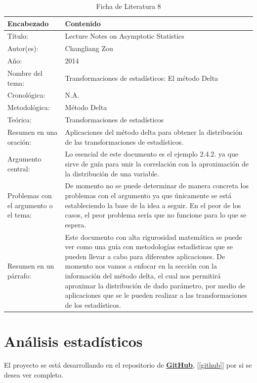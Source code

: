 \begin{table}[H]
    \caption{Ficha de Literatura 8}
    \begin{center}
        \begin{tabular}{  m{3cm} | m{12cm}  }
        \hline\textbf{ Encabezado} & \textbf{Contenido }\\ \hline
        Título: &  Lecture Notes on Asymptotic Statistics \\ \hline
        Autor(es): & Changliang Zou \\ \hline
        Año: &  2014\\ \hline
        Nombre del tema: &  Transformaciones de estadísticos: El método Delta\\ \hline
        Cronológica: &  N.A. \\ \hline
        Metodológica: & Método Delta \\  \hline
        Teórica: &  Transformaciones de estadísticos\\ \hline
        Resumen en una oración: &  Aplicaciones del método delta para obtener la distribución de las transformaciones de estadísticos. \\ \hline
        Argumento central: &  Lo esencial de este documento es el ejemplo 2.4.2. ya que sirve de guía para unir la correlación con la aproximación de la distribución de una variable. \\ \hline
        Problemas con el argumento o el tema: &  De momento no se puede determinar de manera concreta los problemas con el argumento ya que únicamente se está estableciendo la base de la idea a seguir. En el peor de los casos, el peor problema sería que no funcione para lo que se espera.\\ \hline
        Resumen en un párrafo: & Este documento con alta rigurosidad matemática se puede ver como una guía con metodologías estadísticas que se pueden llevar a cabo para diferentes aplicaciones. De momento nos vamos a enfocar en la sección con la información del método delta, el cual nos permitirá aproximar la distribución de dado parámetro, por medio de aplicaciones que se le pueden realizar a las transformaciones de los estadísticos.\\ \hline
        \end{tabular}
    \end{center}
\end{table}

\newpage

\section{Análisis estadísticos}
El proyecto se está desarrollando en el repositorio de \textbf{\href{https://github.com/bluke7ide/Proyecto_Estadistica}{GitHub}}, [\ref{github}] por si se desea ver completo.
